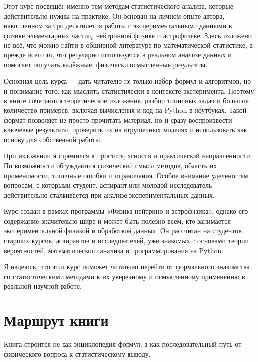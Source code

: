 \documentclass[
  russian,
  12pt,
  a4paper,
  a4paper,
  openany]{scrbook}
\begin{document}
Этот курс посвящён именно тем методам статистического анализа, которые
действительно нужны на практике. Он основан на личном опыте автора,
накопленном за три десятилетия работы с экспериментальными данными в
физике элементарных частиц, нейтринной физике и астрофизике. Здесь
изложено не всё, что можно найти в обширной литературе по математической
статистике, а прежде всего то, что регулярно используется в реальном
анализе данных и помогает получать надёжные, физически осмысленные
результаты.

Основная цель курса --- дать читателю не только набор формул и
алгоритмов, но и понимание того, как мыслить статистически в контексте
эксперимента. Поэтому в книге сочетаются теоретическое изложение, разбор
типичных задач и большое количество примеров, включая вычисления и код
на Python в ноутбуках. Такой формат позволяет не просто прочитать
материал, но и сразу воспроизвести ключевые результаты, проверить их на
игрушечных моделях и использовать как основу для собственной работы.

При изложении я стремился к простоте, ясности и практической
направленности. По возможности обсуждаются физический смысл методов,
область их применимости, типичные ошибки и ограничения. Особое внимание
уделено тем вопросам, с которыми студент, аспирант или молодой
исследователь действительно сталкивается при анализе экспериментальных
данных.

Курс создан в рамках программы «Физика нейтрино и астрофизика», однако
его содержание значительно шире и может быть полезно всем, кто
занимается экспериментальной физикой и обработкой данных. Он рассчитан
на студентов старших курсов, аспирантов и исследователей, уже знакомых с
основами теории вероятностей, математического анализа и программирования
на Python.

Я надеюсь, что этот курс поможет читателю перейти от формального
знакомства со статистическими методами к их уверенному и осмысленному
применению в реальной научной работе.


\chapter*{Маршрут
книги}\label{ux43cux430ux440ux448ux440ux443ux442-ux43aux43dux438ux433ux438}


Книга строится не как энциклопедия формул, а как последовательный путь
от физического вопроса к статистическому выводу.
\end{document}
